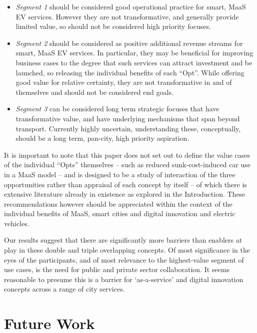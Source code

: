 \documentclass[journal]{IEEEtran}
\begin{document}
\begin{itemize}
\item {\emph{Segment 1}} should be considered good operational practice for
  smart, MaaS EV services. However they are not transformative, and
  generally provide limited value, so should not be considered high
  priority focuses. 
\item {\emph{Segment 2}} should be considered as positive additional revenue
  streams for smart, MaaS EV services. In particular, they may be
  beneficial for improving business cases to the degree that such
  services can attract investment and be launched, so releasing the
  individual benefits of each ``Opt''. While offering good value for
  relative certainty, they are not transformative in and of themselves
  and should not be considered end goals.
\item {\emph{Segment 3}} can be considered long term strategic focuses that
  have transformative value, and have underlying mechanisms that span
  beyond transport. Currently highly uncertain, understanding these,
  conceptually, should be a long term, pan-city, high priority
  aspiration.
\end{itemize}

It is important to note that this paper does not set out to define the
value cases of the individual ``Opts'' themselves -- such as reduced
sunk-cost-induced car use in a MaaS model -- and is designed to be a
study of interaction of the three opportunities rather than appraisal
of each concept by itself -- of which there is extensive literature
already in existence as explored in the Introduction. These
recommendations however should be appreciated within the context of
the individual benefits of MaaS, smart cities and digital innovation
and electric vehicles.

Our results suggest that there are significantly more barriers than
enablers at play in these double and triple overlapping concepts. Of
most significance in the eyes of the participants, and of most
relevance to the highest-value segment of use cases, is the need for
public and private sector collaboration. It seems reasonable to
presume this is a barrier for `as-a-service' and digital innovation
concepts across a range of city services. 



\section{Future Work}\label{future}
\end{document}
